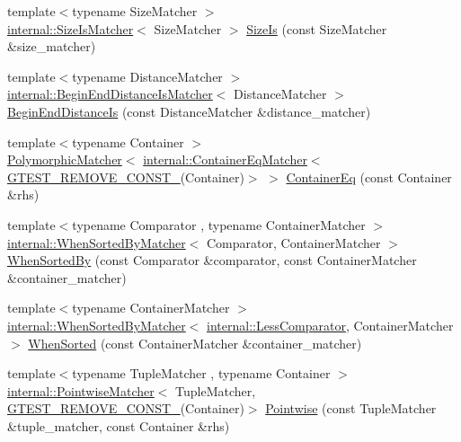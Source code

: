 \begin{DoxyCompactItemize}
\item 
{\footnotesize template$<$typename Size\+Matcher $>$ }\\\hyperlink{classtesting_1_1internal_1_1SizeIsMatcher}{internal\+::\+Size\+Is\+Matcher}$<$ Size\+Matcher $>$ \hyperlink{namespacetesting_acd5e215558f95f1393c048a6d496060d}{Size\+Is} (const Size\+Matcher \&size\+\_\+matcher)
\item 
{\footnotesize template$<$typename Distance\+Matcher $>$ }\\\hyperlink{classtesting_1_1internal_1_1BeginEndDistanceIsMatcher}{internal\+::\+Begin\+End\+Distance\+Is\+Matcher}$<$ Distance\+Matcher $>$ \hyperlink{namespacetesting_a122739b5b6bd9f993f26800dafdb4cc3}{Begin\+End\+Distance\+Is} (const Distance\+Matcher \&distance\+\_\+matcher)
\item 
{\footnotesize template$<$typename Container $>$ }\\\hyperlink{classtesting_1_1PolymorphicMatcher}{Polymorphic\+Matcher}$<$ \hyperlink{classtesting_1_1internal_1_1ContainerEqMatcher}{internal\+::\+Container\+Eq\+Matcher}$<$ \hyperlink{gtest-internal_8h_a2ffec8c60510eb130af387f5ce9a756a}{G\+T\+E\+S\+T\+\_\+\+R\+E\+M\+O\+V\+E\+\_\+\+C\+O\+N\+S\+T\+\_\+}(Container)$>$ $>$ \hyperlink{namespacetesting_a5928ffc4e976a4da981512c422792840}{Container\+Eq} (const Container \&rhs)
\item 
{\footnotesize template$<$typename Comparator , typename Container\+Matcher $>$ }\\\hyperlink{classtesting_1_1internal_1_1WhenSortedByMatcher}{internal\+::\+When\+Sorted\+By\+Matcher}$<$ Comparator, Container\+Matcher $>$ \hyperlink{namespacetesting_af74dfcde9ed88d79cf69dfda049078a3}{When\+Sorted\+By} (const Comparator \&comparator, const Container\+Matcher \&container\+\_\+matcher)
\item 
{\footnotesize template$<$typename Container\+Matcher $>$ }\\\hyperlink{classtesting_1_1internal_1_1WhenSortedByMatcher}{internal\+::\+When\+Sorted\+By\+Matcher}$<$ \hyperlink{structtesting_1_1internal_1_1LessComparator}{internal\+::\+Less\+Comparator}, Container\+Matcher $>$ \hyperlink{namespacetesting_a01468e3e641c72a2efb605b4c34675ee}{When\+Sorted} (const Container\+Matcher \&container\+\_\+matcher)
\item 
{\footnotesize template$<$typename Tuple\+Matcher , typename Container $>$ }\\\hyperlink{classtesting_1_1internal_1_1PointwiseMatcher}{internal\+::\+Pointwise\+Matcher}$<$ Tuple\+Matcher, \hyperlink{gtest-internal_8h_a2ffec8c60510eb130af387f5ce9a756a}{G\+T\+E\+S\+T\+\_\+\+R\+E\+M\+O\+V\+E\+\_\+\+C\+O\+N\+S\+T\+\_\+}(Container)$>$ \hyperlink{namespacetesting_a51ee81f6f1723f7a7aff0429b1d76ec1}{Pointwise} (const Tuple\+Matcher \&tuple\+\_\+matcher, const Container \&rhs)

\end{DoxyCompactItemize}
